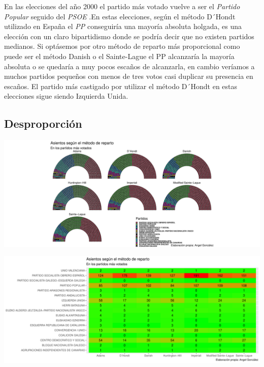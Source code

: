 \documentclass[12pt,a4paper,]{book}
\numberwithin{dummy}{section}
\theoremstyle{ocrenumbox}
\theoremstyle{blacknumex}
\theoremstyle{blacknumbox}
\theoremstyle{ocrenum}
\theoremstyle{ocrenum}
\begin{document}
En las elecciones del año 2000 el partido más votado vuelve a ser el
\emph{Partido Popular} seguido del \emph{PSOE} .En estas elecciones,
según el método D´Hondt utilizado en España el \emph{PP} conseguiría una
mayoría absoluta holgada, es una elección con un claro bipartidismo
donde se podría decir que no existen partidos medianos. Si optásemos por
otro método de reparto más proporcional como puede ser el método Danish
o el Sainte-Lague el PP alcanzaría la mayoría absoluta o se quedaría a
muy pocos escaños de alcanzarla, en cambio veríamos a muchos partidos
pequeños con menos de tres votos casi duplicar su presencia en escaños.
El partido más castigado por utilizar el método D´Hondt en estas
elecciones sigue siendo Izquierda Unida.

\hypertarget{desproporciuxf3n-7}{%
\subsection{Desproporción}\label{desproporciuxf3n-7}}

\begin{center}\includegraphics[width=1\linewidth]{figurasR/unnamed-chunk-98-1} \end{center}

\begin{center}\includegraphics[width=1\linewidth]{figurasR/unnamed-chunk-98-2} \end{center}
\end{document}
